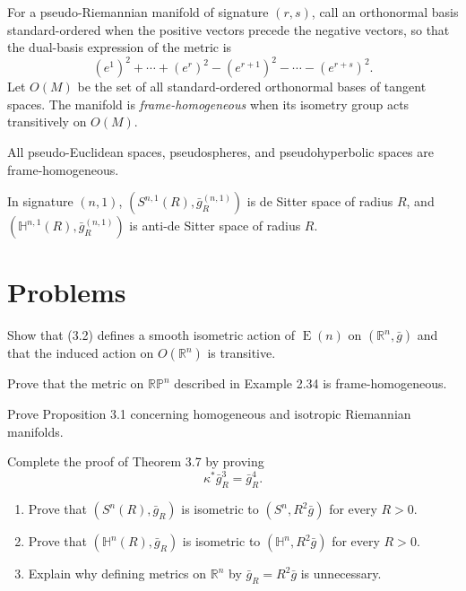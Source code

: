 For a pseudo-Riemannian manifold of signature $(r,s)$, call an orthonormal basis
standard-ordered when the positive vectors precede the negative vectors, so that
the dual-basis expression of the metric is
\[
(e^1)^2+\cdots+(e^r)^2-(e^{r+1})^2-\cdots-(e^{r+s})^2.
\]
Let $O(M)$ be the set of all standard-ordered orthonormal bases of tangent spaces.
The manifold is \emph{frame-homogeneous} when its isometry group acts transitively
on $O(M)$.

\begin{theorem}
\label{thm:frame-homogeneous-pseudo-riemannian}
All pseudo-Euclidean spaces, pseudospheres, and pseudohyperbolic spaces are
frame-homogeneous.
\end{theorem}

In signature $(n,1)$, $(S^{n,1}(R),\bar g_R^{(n,1)})$ is de Sitter space of
radius $R$, and $(\mathbb H^{n,1}(R),\bar g_R^{(n,1)})$ is anti-de Sitter space
of radius $R$.

\section{Problems}

\begin{exercise}
\label{prob:isometric-action-e-n}
Show that (3.2) defines a smooth isometric action of $\operatorname{E}(n)$ on
$(\mathbb R^n,\bar g)$ and that the induced action on $O(\mathbb R^n)$ is
transitive.
\end{exercise}

\begin{exercise}
\label{prob:rp-n-frame-homogeneous}
Prove that the metric on $\mathbb{RP}^n$ described in Example 2.34 is
frame-homogeneous.
\end{exercise}

\begin{exercise}
\label{prob:homogeneous-isotropic-riemannian}
Prove Proposition 3.1 concerning homogeneous and isotropic Riemannian manifolds.
\end{exercise}

\begin{exercise}
\label{prob:theorem-3-7-proof}
Complete the proof of Theorem 3.7 by proving
\[
\kappa^*\bar g_R^3=\bar g_R^4.
\]
\end{exercise}

\begin{exercise}
\label{prob:sphere-hyperbolic-scaling}
\begin{enumerate}
\item[(a)] Prove that $(S^n(R),\bar g_R)$ is isometric to
$(S^n,R^2\bar g)$ for every $R>0$.
\item[(b)] Prove that $(\mathbb H^n(R),\bar g_R)$ is isometric to
$(\mathbb H^n,R^2\bar g)$ for every $R>0$.
\item[(c)] Explain why defining metrics on $\mathbb R^n$ by
$\bar g_R=R^2\bar g$ is unnecessary.
\end{enumerate}
\end{exercise}


